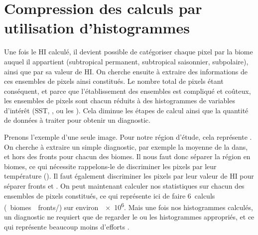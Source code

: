 \begin{figure}
  \centering
  \label{fig:exemples-fronts}
\end{figure}


\section{Compression des calculs par utilisation d'histogrammes}
\label{sec:extraction-hist}

Une fois le HI calculé, il devient possible de catégoriser chaque pixel par la biome auquel il appartient (subtropical permanent, subtropical saisonnier, subpolaire), ainsi que par sa valeur de HI.
On cherche ensuite à extraire des informations de ces ensembles de pixels ainsi constitués.
Le nombre total de pixels étant conséquent, et parce que l'établissement des ensembles est compliqué et coûteux, les ensembles de pixels sont chacun réduits à des histogrammes de variables d'intérêt (SST, , ou les ).
Cela diminue les étapes de calcul ainsi que la quantité de données à traiter pour obtenir un diagnostic.

Prenons l'exemple d'une seule image. Pour notre région d'étude, cela représente .
On cherche à extraire un simple diagnostic, par exemple la moyenne de la  dans, et hors des fronts pour chacun des biomes.
Il nous faut donc séparer la région en biomes, ce qui nécessite rappelons-le de discriminer les pixels par leur température ().
Il faut également discriminer les pixels par leur valeur de HI pour séparer fronts et .
On peut maintenant calculer nos statistiques sur chacun des ensembles de pixels constitués, ce qui représente ici de faire 6~calculs (~biomes~\texttimes\ fronts/) sur environ~\qty{e6}{\pixels}.
Mais une fois nos histogrammes calculés, un diagnostic ne requiert que de regarder le ou les histogrammes appropriés, et ce qui représente beaucoup moins d'efforts .

